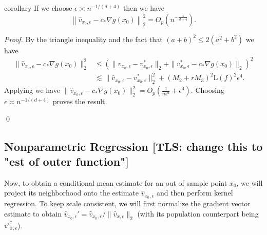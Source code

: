 \documentclass[11pt]{article}
\newcommand{\tls}[1]{{\color{cyan}[TLS: #1]}}
\begin{document}
\begin{restatable}{corollary}{} \label{thm: velocity risk}
    If we choose $\epsilon \asymp n^{-1/(d+4)}$ then we have
    \[\left\|\hat{v}_{x_0, \epsilon} - c_*\nabla g(x_0)\right\|_{2}^2  =  O_p\left(n^{-\frac{4}{d+4}}\right). \]
\end{restatable}
\noindent \textit{Proof.} By the triangle inequality and the fact that $(a + b)^2 \leq 2(a^2 + b^2)$  we have
\begin{align*}
    \|\hat{v}_{x_0, \epsilon} - c_*\nabla g(x_0)\|_{2}^2 &\leq \left(\|\hat{v}_{x_0, \epsilon} - v^*_{x_0, \epsilon}\|_{2} + \|v^*_{x_0, \epsilon}  - c_*\nabla g(x_0)\|_{2}\right)^2 \\
    &\lesssim  \|\hat{v}_{x_0, \epsilon} - v^*_{x_0, \epsilon} \|_{2}^2+  (M_2 + rM_3)^2\text{L}(f)^2\epsilon^4.
\end{align*}
Applying  we have $ \|\hat{v}_{x_0, \epsilon} - c_*\nabla g(x_0)\|_{2}^2 =  O_p(\frac{1}{n\epsilon^d} + \epsilon^4).$ Choosing $\epsilon \asymp n^{-1/(d+4)}$ proves the result.

\qed{}

\subsection{Nonparametric Regression \tls{change this to "est of outer function"}}  \label{sec: regression results presentation}

Now, to obtain a conditional mean estimate for an out of sample point $x_0$, we will project its neighborhood onto the estimate $\hat{v}_{x_0, \epsilon}$ and then perform kernel regression. To keep scale consistent, we will first normalize the gradient vector estimate to obtain $\hat{v}_{x_0, \epsilon}' = \hat{v}_{x_0, \epsilon}/\|\hat{v}_{x, \epsilon}\|_2$ (with its population counterpart being $v'^{*}_{x, \epsilon}$). 
\end{document}
